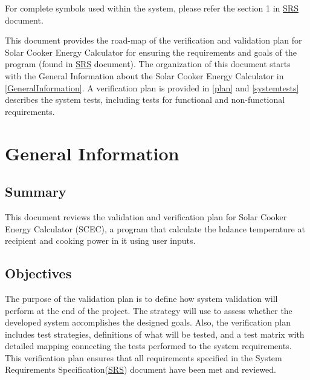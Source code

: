 \documentclass[12pt, titlepage]{article}
\begin{document}
For complete symbols used within the system, please refer the section 1 in 
  \href{https://github.com/DeeshaPatel/CAS-741-Solar-Cooker/blob/7c53c8d9a19ca2f94dfba6ba9208eae0bf03b8cc/docs/SRS/SRS.pdf}{SRS} document.


\newpage


This document provides the road-map of the verification and validation plan for Solar Cooker Energy Calculator for ensuring the requirements and goals of the program (found in \href{https://github.com/DeeshaPatel/CAS-741-Solar-Cooker/blob/7c53c8d9a19ca2f94dfba6ba9208eae0bf03b8cc/docs/SRS/SRS.pdf}{SRS} document). The organization of this document starts with the General Information about the Solar Cooker Energy Calculator in \autoref{GeneralInformation}. A verification plan is provided in \autoref{plan} and \autoref{systemtests} describes the system tests, including tests for functional and non-functional requirements.
  

\section{General Information}
\label{GeneralInformation}

\subsection{Summary}

This document reviews the validation and verification plan for Solar Cooker Energy Calculator (SCEC), a program that calculate the balance temperature at recipient and cooking power in it using user inputs.  

\subsection{Objectives}

The purpose of the validation plan is to define how system validation will perform at the end of the project. The strategy will use to assess whether the developed system accomplishes the designed goals. Also, the verification plan includes test strategies, definitions of what will be tested, and a test matrix with detailed mapping connecting the tests performed to the system requirements. This verification plan ensures that all requirements specified in the System Requirements Specification(\href{https://github.com/DeeshaPatel/CAS-741-Solar-Cooker/blob/7c53c8d9a19ca2f94dfba6ba9208eae0bf03b8cc/docs/SRS/SRS.pdf}{SRS}) document have been met and reviewed.
\end{document}
